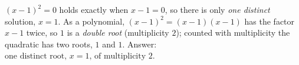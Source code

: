 $(x-1)^2=0$ holds exactly when $x-1=0$, so there is only \emph{one distinct} solution, $x=1$. As a polynomial, $(x-1)^2=(x-1)(x-1)$ has the factor $x-1$ twice, so $1$ is a \emph{double root} (multiplicity $2$); counted with multiplicity the quadratic has two roots, $1$ and $1$. Answer: $\boxed{\text{one distinct root, }x=1\text{, of multiplicity }2}$.
